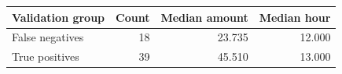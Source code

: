 \begin{tabular}{lrrr}
\toprule
Validation group & Count & Median amount & Median hour \\
\midrule
False negatives & 18 & 23.735 & 12.000 \\
True positives & 39 & 45.510 & 13.000 \\
\bottomrule
\end{tabular}
